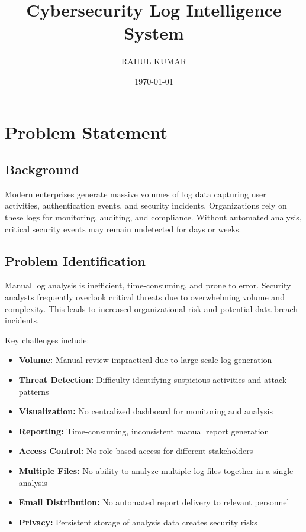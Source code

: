\documentclass[12pt,a4paper]{article}
\title{\textbf{Cybersecurity Log Intelligence System}}
\author{RAHUL KUMAR}
\date{\today}
\begin{document}
\maketitle
\thispagestyle{fancy}

\section{Problem Statement}

\subsection{Background}

Modern enterprises generate massive volumes of log data capturing user activities, authentication events, and security incidents. Organizations rely on these logs for monitoring, auditing, and compliance. Without automated analysis, critical security events may remain undetected for days or weeks.

\subsection{Problem Identification}

Manual log analysis is inefficient, time-consuming, and prone to error. Security analysts frequently overlook critical threats due to overwhelming volume and complexity. This leads to increased organizational risk and potential data breach incidents.

Key challenges include:
\begin{itemize}
    \item \textbf{Volume:} Manual review impractical due to large-scale log generation
    \item \textbf{Threat Detection:} Difficulty identifying suspicious activities and attack patterns
    \item \textbf{Visualization:} No centralized dashboard for monitoring and analysis
    \item \textbf{Reporting:} Time-consuming, inconsistent manual report generation
    \item \textbf{Access Control:} No role-based access for different stakeholders
    \item \textbf{Multiple Files:} No ability to analyze multiple log files together in a single analysis
    \item \textbf{Email Distribution:} No automated report delivery to relevant personnel
    \item \textbf{Privacy:} Persistent storage of analysis data creates security risks
\end{itemize}
\end{document}

